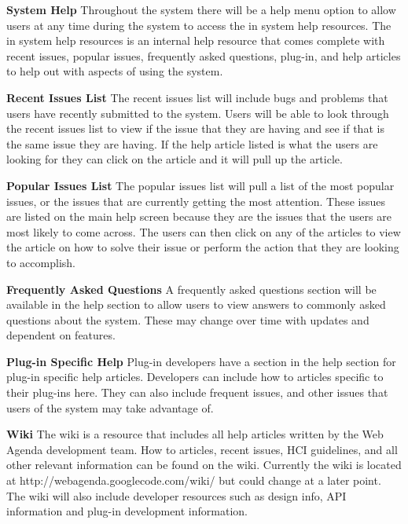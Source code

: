 \documentclass[letterpaper,12pt]{report}
\begin{document}
\begin{description}
 \item \textbf{System Help} \newline \hspace*{1cm} Throughout the system there will be a help menu option to allow users at any time during the system to access the in system help resources. The in system help resources is an internal help resource that comes complete with recent issues, popular issues, frequently asked questions, plug-in, and help articles to help out with aspects of using the system.
 \item \textbf{Recent Issues List} \newline \hspace*{1cm} The recent issues list will include bugs and problems that users have recently submitted to the system. Users will be able to look through the recent issues list to view if the issue that they are having and see if that is the same issue they are having. If the help article listed is what the users are looking for they can click on the article and it will pull up the article.
 \item \textbf{Popular Issues List} \newline \hspace*{1cm} The popular issues list will pull a list of the most popular issues, or the issues that are currently getting the most attention. These issues are listed on the main help screen because they are the issues that the users are most likely to come across. The users can then click on any of the articles to view the article on how to solve their issue or perform the action that they are looking to accomplish.
 \item \textbf{Frequently Asked Questions} \newline \hspace*{1cm} A frequently asked questions section will be available in the help section to allow users to view answers to commonly asked questions about the system. These may change over time with updates and dependent on features.
 \item \textbf{Plug-in Specific Help} \newline \hspace*{1cm} Plug-in developers have a section in the help section for plug-in specific help articles. Developers can include how to articles specific to their plug-ins here. They can also include frequent issues, and other issues that users of the system may take advantage of.
 \item \textbf{Wiki} \newline \hspace*{1cm} The wiki is a resource that includes all help articles written by the Web Agenda development team. How to articles, recent issues, HCI guidelines, and all other relevant information can be found on the wiki. Currently the wiki is located at http://webagenda.googlecode.com/wiki/ but could change at a later point. The wiki will also include developer resources such as design info, API information and plug-in development information.
 \end{description}
\end{document}
